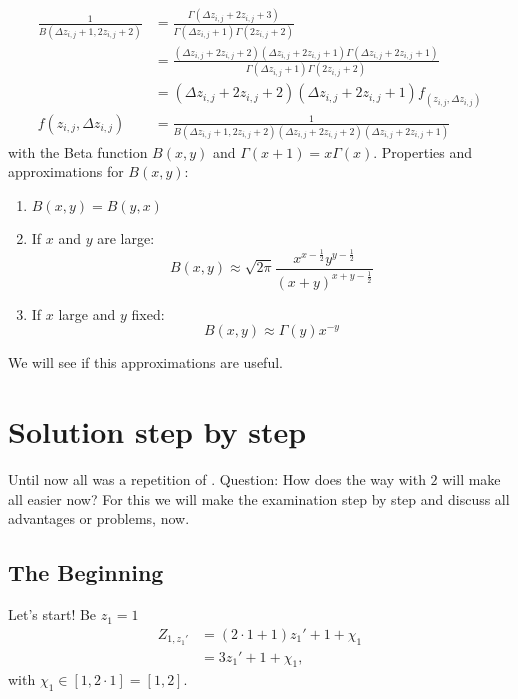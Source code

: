 \begin{equation}\begin{split}
	\frac{1}{B\left(\Delta z_{i,j} + 1, 2z_{i,j} + 2\right)} & = \frac{\Gamma\left(\Delta z_{i,j} + 2z_{i,j} + 3\right)}{\Gamma\left(\Delta z_{i,j} + 1\right)\Gamma\left(2z_{i,j} + 2\right)} \\
	& = \frac{\left(\Delta z_{i,j} + 2z_{i,j} + 2\right)\left(\Delta z_{i,j} + 2z_{i,j} + 1\right) \Gamma\left(\Delta z_{i,j} + 2z_{i,j} + 1\right)}{\Gamma\left(\Delta z_{i,j} + 1\right)\Gamma\left(2z_{i,j} + 2\right)} \\
	& = \left(\Delta z_{i,j} + 2z_{i,j} + 2\right)\left(\Delta z_{i,j} + 2z_{i,j} + 1\right) f_{\left(z_{i,j}, \Delta z_{i,j}\right)} \\
	f\left(z_{i,j}, \Delta z_{i,j}\right) & = \frac{1}{B\left(\Delta z_{i,j} + 1, 2z_{i,j} + 2\right)\left(\Delta z_{i,j} + 2z_{i,j} + 2\right)\left(\Delta z_{i,j} + 2z_{i,j} + 1\right)}
\end{split}\label{eq:gammafunczsolV1}\end{equation} 
with the Beta function $B\left(x,y\right)$ and $\Gamma\left(x+1\right) = x\Gamma\left(x\right)$. Properties and approximations for $B\left(x,y\right)$:
\begin{enumerate}
	\item $B\left(x,y\right) = B\left(y,x\right)$
	\item If $x$ and $y$ are large:
		\[ B(x,y) \approx \sqrt{2\pi} \frac{x^{x - \frac{1}{2}}y^{y - \frac{1}{2}}}{\left(x + y\right)^{x + y - \frac{1}{2}}} \]
	\item If $x$ large and $y$ fixed:
		\[ B(x,y) \approx \Gamma\left(y\right) x^{-y} \]
\label{en:propBetafunction}\end{enumerate}
We will see if this approximations are useful.
\section{Solution step by step}
\label{s:solstepbystep}
Until now all was a repetition of \cite{2014arXiv1411.2824Z}. Question: How does the way with $2$ will make all easier now? For this we will make the examination step by step and discuss all advantages or problems, now.
\subsection{The Beginning}
\label{ss:thebeginning}
Let's start! Be $z_{1} = 1$
\begin{equation}\begin{split}
	Z_{1,z_{1}\prime} & = \left(2 \cdot 1 + 1\right)z_{1}\prime + 1 + \chi_{1} \\
	& = 3z_{1}\prime + 1 + \chi_{1},
\end{split}\label{eq:z1prime}\end{equation}
with $\chi_{1} \in [ 1, 2 \cdot 1] = [1, 2]$.

